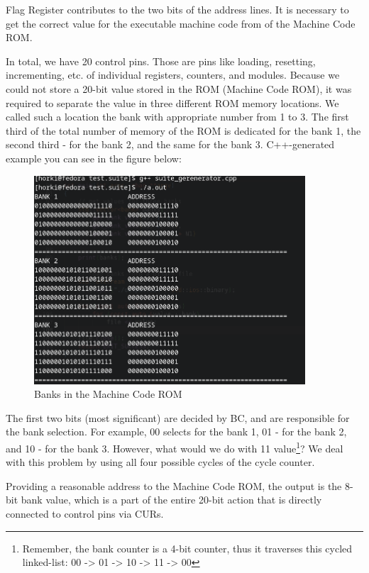 Flag Register contributes to the two bits of the address lines. It is necessary to get the correct value for the executable machine code from of the Machine Code ROM.

In total, we have 20 control pins. Those are pins like loading, resetting, incrementing, etc. of individual registers, counters, and modules. Because we could not store a 20-bit value stored in the ROM (Machine Code ROM), it was required to separate the value in three different ROM memory locations. We called such a location the bank with appropriate number from 1 to 3. The first third of the total number of memory of the ROM is dedicated for the bank 1, the second third - for the bank 2, and the same for the bank 3. C++-generated example you can see in the figure below:

\begin{figure}[H]
	\centering
	\includegraphics[width=0.9\textwidth]{img/bank_separation_example}
	\caption{Banks in the Machine Code ROM}
	\label{fig:bank_separation_example}
\end{figure}

The first two bits (most significant) are decided by BC, and are responsible for the bank selection. For example, 00 selects for the bank 1, 01 - for the bank 2, and 10 - for the bank 3. However, what would we do with 11 value\footnote{Remember, the bank counter is a 4-bit counter, thus it traverses this cycled linked-list: 00 -> 01 -> 10 -> 11 -> 00}? We deal with this problem by using all four possible cycles of the cycle counter. 

Providing a reasonable address to the Machine Code ROM, the output is the 8-bit bank value, which is a part of the entire 20-bit action that is directly connected to control pins via CURs. 

